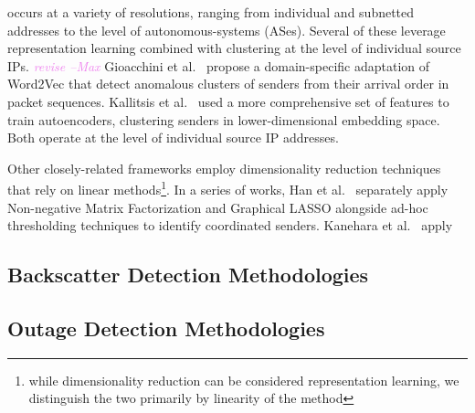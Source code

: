 \documentclass[manuscript,nonacm]{acmart}
\newcommand{\maxnote}[1]{\textit{\textcolor{violet}{#1 --Max}}}
\begin{document}
 occurs at a variety of resolutions, ranging from individual and subnetted addresses to the level of autonomous-systems (ASes).
Several of these leverage representation learning combined with clustering at the level of individual source IPs. \maxnote{revise}
Gioacchini et al.~\cite{@@} propose a domain-specific adaptation of Word2Vec that detect anomalous clusters of senders from their arrival order in packet sequences. 
Kallitsis et al.~\cite{@@} used a more comprehensive set of features to train autoencoders, clustering senders in lower-dimensional embedding space.
Both operate at the level of individual source IP addresses. 

Other closely-related frameworks employ dimensionality reduction techniques that rely on linear methods\footnote{while dimensionality reduction can be considered representation learning, we distinguish the two primarily by linearity of the method}.
In a series of works, Han et al.~\cite{@@} separately apply Non-negative Matrix Factorization and Graphical LASSO alongside ad-hoc thresholding techniques to identify coordinated senders.
Kanehara et al.~\cite{@@} apply 





\vspace{0.25em}


\subsection{Backscatter Detection Methodologies}


\subsection{Outage Detection Methodologies}
\end{document}
